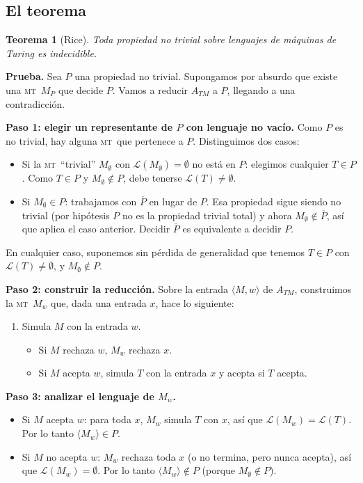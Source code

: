 \documentclass[11pt,a4paper]{article}
\theoremstyle{definicion}
\newtheorem{teorema}[definicion]{Teorema}
\newcommand{\MT}{\textsc{mt}}
\newcommand{\enc}[1]{\langle #1 \rangle}
\newcommand{\Lang}{\mathcal{L}}
\begin{document}
\subsection{El teorema}

\begin{teorema}[Rice]
Toda propiedad no trivial sobre lenguajes de máquinas de Turing es indecidible.
\end{teorema}

\textbf{Prueba.} Sea $P$ una propiedad no trivial. Supongamos por absurdo que existe una \MT\ $M_P$ que decide $P$. Vamos a reducir $A_{TM}$ a $P$, llegando a una contradicción.

\textbf{Paso 1: elegir un representante de $P$ con lenguaje no vacío.} Como $P$ es no trivial, hay alguna \MT\ que pertenece a $P$. Distinguimos dos casos:
\begin{itemize}
    \item Si la \MT\ ``trivial'' $M_\emptyset$ con $\Lang(M_\emptyset) = \emptyset$ no está en $P$: elegimos cualquier $T \in P$. Como $T \in P$ y $M_\emptyset \notin P$, debe tenerse $\Lang(T) \neq \emptyset$.
    \item Si $M_\emptyset \in P$: trabajamos con $\overline{P}$ en lugar de $P$. Esa propiedad sigue siendo no trivial (por hipótesis $P$ no es la propiedad trivial total) y ahora $M_\emptyset \notin \overline{P}$, así que aplica el caso anterior. Decidir $\overline{P}$ es equivalente a decidir $P$.
\end{itemize}

En cualquier caso, suponemos sin pérdida de generalidad que tenemos $T \in P$ con $\Lang(T) \neq \emptyset$, y $M_\emptyset \notin P$.

\textbf{Paso 2: construir la reducción.} Sobre la entrada $\enc{M, w}$ de $A_{TM}$, construimos la \MT\ $M_w$ que, dada una entrada $x$, hace lo siguiente:
\begin{enumerate}
    \item Simula $M$ con la entrada $w$.
    \begin{itemize}
        \item Si $M$ rechaza $w$, $M_w$ rechaza $x$.
        \item Si $M$ acepta $w$, simula $T$ con la entrada $x$ y acepta si $T$ acepta.
    \end{itemize}
\end{enumerate}

\textbf{Paso 3: analizar el lenguaje de $M_w$.}
\begin{itemize}
    \item Si $M$ acepta $w$: para toda $x$, $M_w$ simula $T$ con $x$, así que $\Lang(M_w) = \Lang(T)$. Por lo tanto $\enc{M_w} \in P$.
    \item Si $M$ no acepta $w$: $M_w$ rechaza toda $x$ (o no termina, pero nunca acepta), así que $\Lang(M_w) = \emptyset$. Por lo tanto $\enc{M_w} \notin P$ (porque $M_\emptyset \notin P$).
\end{itemize}
\end{document}
